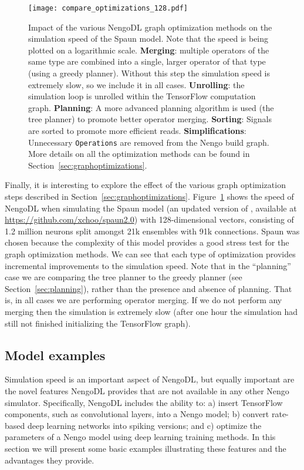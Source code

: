 \documentclass{article}
\begin{document}
\begin{figure}
\centering
\texttt{[image: compare\_optimizations\_128.pdf]}
\caption{Impact of the various NengoDL graph optimization methods on the simulation speed of the Spaun model.  Note that the speed is being plotted on a logarithmic scale.  {\bf Merging}: multiple operators of the same type are combined into a single, larger operator of that type (using a greedy planner).  Without this step the simulation speed is extremely slow, so we include it in all cases.  {\bf Unrolling}: the simulation loop is unrolled within the TensorFlow computation graph.  {\bf Planning}: A more advanced planning algorithm is used (the tree planner) to promote better operator merging.  {\bf Sorting}: Signals are sorted to promote more efficient reads.  {\bf Simplifications}: Unnecessary \texttt{Operations} are removed from the Nengo build graph.  More details on all the optimization methods can be found in Section~\ref{sec:graphoptimizations}.}
\label{fig:compare_optimizations}
\end{figure}

Finally, it is interesting to explore the effect of the various graph optimization steps described in Section~\ref{sec:graphoptimizations}.  Figure~\ref{fig:compare_optimizations} shows the speed of NengoDL when simulating the Spaun model (an updated version of \citealt{Eliasmith2012a}, available at \url{https://github.com/xchoo/spaun2.0}) with 128-dimensional vectors, consisting of 1.2 million neurons split amongst 21k ensembles with 91k connections.  Spaun was chosen because the complexity of this model provides a good stress test for the graph optimization methods.  We can see that each type of optimization provides incremental improvements to the simulation speed.  Note that in the ``planning'' case we are comparing the tree planner to the greedy planner (see Section~\ref{sec:planning}), rather than the presence and absence of planning.  That is, in all cases we are performing operator merging.  If we do not perform any merging then the simulation is extremely slow (after one hour the simulation had still not finished initializing the TensorFlow graph).

\subsection{Model examples}

Simulation speed is an important aspect of NengoDL, but equally important are the novel features NengoDL provides that are not available in any other Nengo simulator.  Specifically, NengoDL includes the ability to: a) insert TensorFlow components, such as convolutional layers, into a Nengo model; b) convert rate-based deep learning networks into spiking versions; and c) optimize the parameters of a Nengo model using deep learning training methods.  In this section we will present some basic examples illustrating these features and the advantages they provide.
\end{document}
